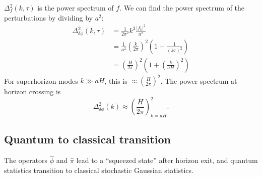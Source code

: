 \documentclass{jknotes}
\begin{document}
\(\Delta^2_f(k,\tau)\) is the power spectrum of \(f\). We can find the power spectrum of the perturbations by dividing by \(a^2\):
\begin{align}
    \Delta^2_{\delta\phi}(k,\tau) &= \frac{1}{2\pi^2}k^3\frac{|f_k|^2}{a^2} \\
                                  &= \frac1{a^2}\left(\frac{k}{2\pi}\right)^2\left(1+\frac1{(k\tau)^2}\right) \\
                                  &= \left(\frac{H}{2\pi}\right)^2\left(1+\left(\frac{k}{aH}\right)^2\right)
\end{align}
For superhorizon modes \(k \gg aH\), this is \(\approx \left(\frac{H}{2\pi}\right)^2\). The power spectrum at horizon crossing is
\begin{equation}
\Delta_{\delta\phi}^2(k)\approx\left(\frac{H}{2\pi}\right)^2_{k=aH}.
\end{equation}

\subsection{Quantum to classical transition}
The operators \(\hat{\phi}\) and \(\hat{\pi}\) lead to a ``squeezed state'' after horizon exit, and quantum statistics transition to classical stochastic Gaussian statistics.
\begin{figure}[H]
    \centering
\end{figure}
\end{document}
